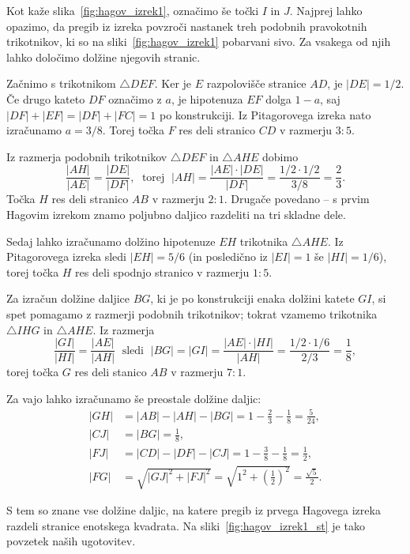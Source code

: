 \begin{dokaz}
    Kot kaže slika~\ref{fig:hagov_izrek1}, označimo še točki $I$ in $J$. Najprej lahko opazimo, da pregib iz izreka povzroči nastanek treh podobnih pravokotnih trikotnikov, ki so na sliki~\ref{fig:hagov_izrek1} pobarvani sivo. Za vsakega od njih lahko določimo dolžine njegovih stranic.

    Začnimo s trikotnikom $\triangle DEF$. Ker je $E$ razpolovišče stranice $AD$, je $|DE| = 1/2$. Če drugo kateto $DF$ označimo z $a$, je hipotenuza $EF$ dolga $1-a$, saj $|DF| + |EF| = |DF| + |FC| = 1$ po konstrukciji. Iz Pitagorovega izreka nato izračunamo $a = 3/8$. Torej točka $F$ res deli stranico $CD$ v razmerju $3:5$.

    Iz razmerja podobnih trikotnikov $\triangle DEF$ in $\triangle AHE$ dobimo
    $$ \frac{|AH|}{|AE|} = \frac{|DE|}{|DF|}, \; \text{ torej } \; |AH| = \frac{|AE|\cdot|DE|}{|DF|} = \frac{1/2 \cdot 1/2}{3/8} = \frac{2}{3}.$$
    Točka $H$ res deli stranico $AB$ v razmerju $2:1$. Drugače povedano -- s prvim Hagovim izrekom znamo poljubno daljico razdeliti na tri skladne dele.

    Sedaj lahko izračunamo dolžino hipotenuze $EH$ trikotnika $\triangle AHE$. Iz Pitagorovega izreka sledi $|EH| = 5/6$ (in posledično iz $|EI| = 1$ še $|HI| = 1/6$), torej točka $H$ res deli spodnjo stranico v razmerju $1:5$.

    Za izračun dolžine daljice $BG$, ki je po konstrukciji enaka dolžini katete $GI$, si spet pomagamo z razmerji podobnih trikotnikov; tokrat vzamemo trikotnika $\triangle IHG$ in $\triangle AHE$. Iz razmerja
    $$ \frac{|GI|}{|HI|} = \frac{|AE|}{|AH|} \; \text{ sledi } \; |BG| = |GI| = \frac{|AE|\cdot|HI|}{|AH|} = \frac{1/2 \cdot 1/6}{2/3} = \frac{1}{8},$$
    torej točka $G$ res deli stanico $AB$ v razmerju $7:1$.
\end{dokaz}

Za vajo lahko izračunamo še preostale dolžine daljic:
\begin{align*}
    |GH| &= |AB| - |AH| - |BG| = 1 - \frac{2}{3} - \frac{1}{8} = \frac{5}{24},\\
    |CJ| &= |BG| = \frac{1}{8},\\
    |FJ| &= |CD| - |DF| - |CJ| = 1 - \frac{3}{8} - \frac{1}{8} = \frac{1}{2},\\
    |FG| &= \sqrt{|GJ|^2 + |FJ|^2} = \sqrt{1^2 + \left(\frac{1}{2}\right)^2} = \frac{\sqrt{5}}{2}.
\end{align*}

S tem so znane vse dolžine daljic, na katere pregib iz prvega Hagovega izreka razdeli stranice enotskega kvadrata. Na sliki~\ref{fig:hagov_izrek1_st} je tako povzetek naših ugotovitev.


